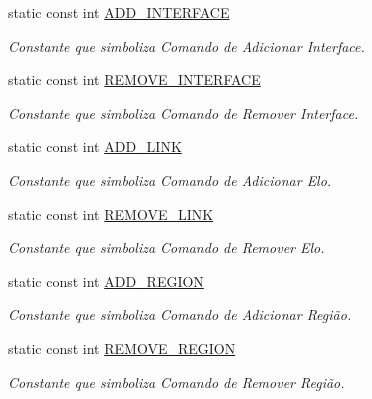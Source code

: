 \begin{DoxyCompactItemize}
static const int \hyperlink{classbr_1_1ufscar_1_1lince_1_1ginga_1_1wac_1_1editing_1_1EditingCommand_aa89778b585a254f911e3f767a5cd4923}{ADD\_\-INTERFACE}
\begin{DoxyCompactList}\small\item\em Constante que simboliza Comando de Adicionar Interface. \item\end{DoxyCompactList}\item 
static const int \hyperlink{classbr_1_1ufscar_1_1lince_1_1ginga_1_1wac_1_1editing_1_1EditingCommand_ae24a541d10968b24c85b12d5d7fb9542}{REMOVE\_\-INTERFACE}
\begin{DoxyCompactList}\small\item\em Constante que simboliza Comando de Remover Interface. \item\end{DoxyCompactList}\item 
static const int \hyperlink{classbr_1_1ufscar_1_1lince_1_1ginga_1_1wac_1_1editing_1_1EditingCommand_a0bc520ae2a61697821058d8a54ddd9fa}{ADD\_\-LINK}
\begin{DoxyCompactList}\small\item\em Constante que simboliza Comando de Adicionar Elo. \item\end{DoxyCompactList}\item 
static const int \hyperlink{classbr_1_1ufscar_1_1lince_1_1ginga_1_1wac_1_1editing_1_1EditingCommand_aa2b6da3065dd18818f8ffaa89ea0cd0b}{REMOVE\_\-LINK}
\begin{DoxyCompactList}\small\item\em Constante que simboliza Comando de Remover Elo. \item\end{DoxyCompactList}\item 
static const int \hyperlink{classbr_1_1ufscar_1_1lince_1_1ginga_1_1wac_1_1editing_1_1EditingCommand_ae20dc6b5472ef3d2e917e14d05f34632}{ADD\_\-REGION}
\begin{DoxyCompactList}\small\item\em Constante que simboliza Comando de Adicionar Região. \item\end{DoxyCompactList}\item 
static const int \hyperlink{classbr_1_1ufscar_1_1lince_1_1ginga_1_1wac_1_1editing_1_1EditingCommand_a44413aeba52921edecd3273abf5eec4e}{REMOVE\_\-REGION}
\begin{DoxyCompactList}\small\item\em Constante que simboliza Comando de Remover Região. \item\end{DoxyCompactList}\end{DoxyCompactItemize}
